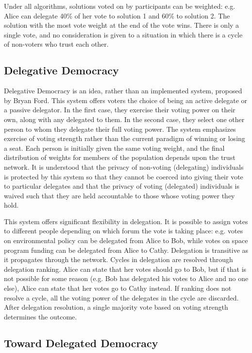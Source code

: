 \documentclass[a4paper]{acm_proc_article-sp}
\begin{document}
Under all algorithms, solutions voted on by participants can be weighted: e.g. Alice can delegate 40\% of her vote to
solution 1 and 60\% to solution 2.  The solution with the most vote weight at the end of the vote wins.  There is
only a single vote, and no consideration is given to a situation in which there is a cycle of non-voters who trust each other.

\subsection{Delegative Democracy}

Delegative Democracy \cite{delegative} is an idea, rather than an implemented system, proposed by Bryan Ford.  This system offers voters the
choice of being an active delegate or a passive delegator.  In the first case, they exercise their voting power on their own,
along with any delegated to them.  In the second case, they select one other person to whom they delegate their full voting power.
The system emphasizes exercise of voting strength rather than the current paradigm of winning or losing a seat.  Each person is
initially given the same voting weight, and the final distribution of weights for members of the population depends upon the
trust network.  It is understood that the privacy of non-voting (delegating) individuals is protected by this
system so that they cannot be coerced into giving their vote to particular delegates and that the privacy of voting (delegated)
individuals is waived such that they are held accountable to those whose voting power they hold.

This system offers significant flexibility in delegation.  It is possible to assign votes to different people depending on
which forum the vote is taking place: e.g. votes on environmental policy can be delegated from Alice to Bob, while votes on
space program funding can be delegated from Alice to Cathy.  Delegation is transitive as it propagates through the network.
Cycles in delegation are resolved through delegation ranking.  Alice can state that her votes should go to Bob, but if that is
not possible for some reason (e.g. Bob has delegated his votes to Alice and no one else), Alice can state that her votes go to
Cathy instead.  If ranking does not resolve a cycle, all the voting power of the delegates in the cycle are discarded.  After
delegation resolution, a single majority vote based on voting strength determines the outcome.

\subsection{Toward Delegated Democracy}
\end{document}
